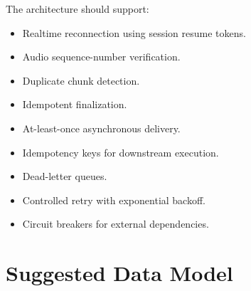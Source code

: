 \documentclass[11pt,a4paper]{article}
\begin{document}
The architecture should support:

\begin{itemize}
\item Realtime reconnection using session resume tokens.
\item Audio sequence-number verification.
\item Duplicate chunk detection.
\item Idempotent finalization.
\item At-least-once asynchronous delivery.
\item Idempotency keys for downstream execution.
\item Dead-letter queues.
\item Controlled retry with exponential backoff.
\item Circuit breakers for external dependencies.
\end{itemize}

\section{Suggested Data Model}
\end{document}
